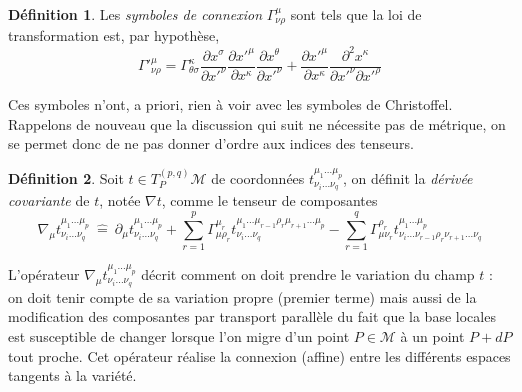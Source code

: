 \documentclass[a4paper,11pt]{report}
\theoremstyle{definition}
\theoremstyle{plain}
\theoremstyle{definition}
\newtheorem{defn}{Définition}[chapter]
\theoremstyle{remark}
\newcommand{\M}{\mathscr{M}}
\newcommand{\p}{\partial}
\begin{document}
                \begin{defn}
                    Les \textit{symboles de connexion} $\Gamma^\mu_{\nu\rho}$ sont tels que la loi de transformation est, par hypothèse,
                    \begin{equation}
                        \Gamma'^\mu_{\nu\rho} = \Gamma^\kappa_{\theta\sigma}\frac{\p x^\sigma}{\p x'^\nu} \frac{\p x'^\mu}{\p x^\kappa}\frac{\p x^\theta}{\p x'^\nu} +  \frac{\p x'^\mu}{\p x^\kappa}\frac{\p^2 x^\kappa}{\p x'^\nu\p x'^\rho}
                    \end{equation}
                \end{defn}
                
                Ces symboles n'ont, a priori, rien à voir avec les symboles de Christoffel. Rappelons de nouveau que la discussion qui suit ne nécessite pas de métrique, on se permet donc de ne pas donner d'ordre aux indices des tenseurs.
                
                \begin{defn}
                    Soit $t\in T_P^{(p,q)}\M$ de coordonnées $t^{\mu_1\dots\mu_p}_{\nu_i\dots\nu_q}$, on définit la \textit{dérivée covariante} de $t$, notée $\nabla t$, comme le tenseur de composantes
                    \begin{equation}
                        \nabla_\mu t^{\mu_1\dots\mu_p}_{\nu_i\dots\nu_q} ~\hat{=}~ \p_\mu t^{\mu_1\dots\mu_p}_{\nu_i\dots\nu_q}+\sum_{r=1}^p \Gamma^{\mu_r}_{\mu\rho_r}t^{\mu_1\dots\mu_{r-1}\rho_r\mu_{r+1}\dots\mu_p}_{\nu_i\dots\nu_q} - \sum_{r=1}^q \Gamma^{\rho_r}_{\mu\nu_r}t^{\mu_1\dots\mu_p}_{\nu_i\dots\nu_{r-1}\rho_r\nu_{r+1}\dots\nu_q}
                    \end{equation}
                \end{defn}
                
                L'opérateur $\nabla_\mu t^{\mu_1\dots\mu_p}_{\nu_i\dots\nu_q}$ décrit comment on doit prendre le variation du champ $t$ :  on doit tenir compte de sa variation propre (premier terme) mais aussi de la modification des composantes par transport parallèle du fait que la base locales est susceptible de changer lorsque l'on migre d'un point $P\in\M$ à un point $P+dP$ tout proche. Cet opérateur réalise la connexion (affine) entre les différents espaces tangents à la variété.
                
\end{document}
